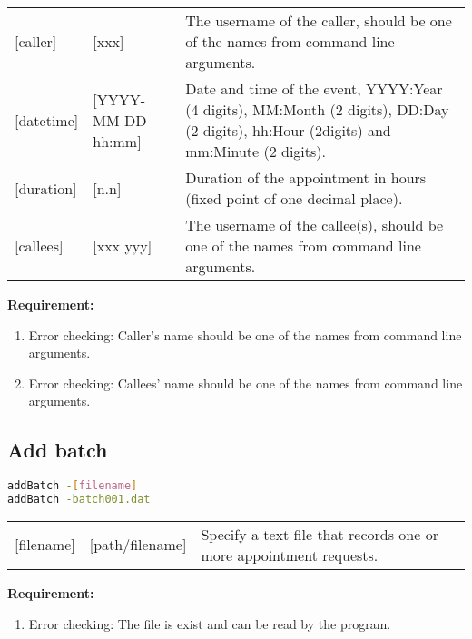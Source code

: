 \documentclass[12pt,a4paper]{report}
\begin{document}
\begin{table}[h]
\begin{tabular}{lll}
{[}caller{]} & {[}xxx{]} & The username of the caller, should be one of the names from command line arguments. \\
{[}datetime{]} & {[}YYYY-MM-DD hh:mm{]} & \parbox[t]{15cm}{Date and time of the event, YYYY:Year (4 digits), MM:Month (2 digits), DD:Day (2 digits), hh:Hour (2digits) and mm:Minute (2 digits).} \\
{[}duration{]}  & {[}n.n{]} & Duration of the appointment in hours (fixed point of one decimal place). \\
{[}callees{]}  & {[}xxx yyy{]} & The username of the callee(s), should be one of the names from command line arguments.
\end{tabular}
\end{table}

\textbf{Requirement:}
\begin{enumerate}
\item Error checking: Caller's name should be one of the names from command line arguments.
\item Error checking: Callees' name should be one of the names from command line arguments.
\end{enumerate}

\subsection{Add batch}
\begin{lstlisting}[language=bash,basicstyle=\ttfamily,keywordstyle=\bfseries]
addBatch -[filename]
addBatch -batch001.dat
\end{lstlisting}

\begin{table}[h]
\begin{tabular}{lll}
{[}filename{]} & {[}path/filename{]} & Specify a text file that records one or more appointment requests.
\end{tabular}
\end{table}

\textbf{Requirement:}
\begin{enumerate}
\item Error checking: The file is exist and can be read by the program.
\end{enumerate}

\end{document}
